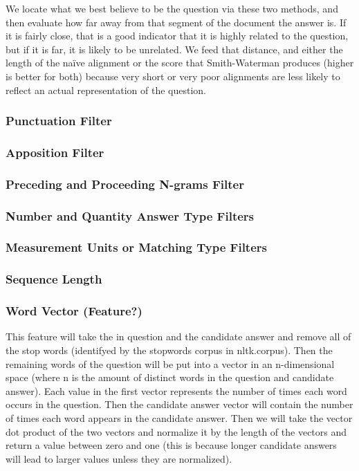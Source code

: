 \documentclass{article}
\begin{document}
	We locate what we best believe to be the question via these two methods, and
	then evaluate how far away from that segment of the document the answer is.
	If it is fairly close, that is a good indicator that it is highly related to
	the question, but if it is far, it is likely to be unrelated.  We feed that
	distance, and either the length of the na\"ive alignment or the score that
	Smith-Waterman produces (higher is better for both) because very short or
	very poor alignments are less likely to reflect an actual representation of
	the question.

\subsubsection{Punctuation Filter}

\subsubsection{Apposition Filter}

\subsubsection{Preceding and Proceeding N-grams Filter}

\subsubsection{Number and Quantity Answer Type Filters}

\subsubsection{Measurement Units or Matching Type Filters}

\subsubsection{Sequence Length}

\subsubsection{Word Vector (Feature?)}
This feature will take the in question and the candidate answer and remove all of the stop words (identifyed by the stopwords corpus in nltk.corpus).  Then the remaining words of the question will be put into a vector in an n-dimensional space (where n is the amount of distinct words in the question and candidate answer).  Each value in the first vector represents the number of times each word occurs in the question.  Then the candidate answer vector will contain the number of times each word appears in the candidate answer. Then we will take the vector dot product of the two vectors and normalize it by the length of the vectors and return a value between zero and one (this is because longer candidate answers will lead to larger values unless they are normalized).
\end{document}
